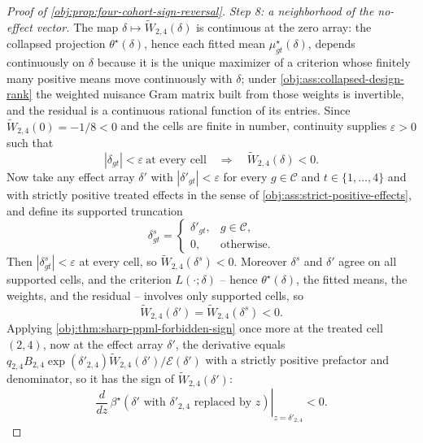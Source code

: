 \begin{proof}[Proof of \cref{obj:prop:four-cohort-sign-reversal}]
\textit{Step 8: a neighborhood of the no-effect vector.} The map \(\delta\mapsto\widetilde W_{2,4}(\delta)\) is continuous at the zero array: the collapsed projection \(\theta^\star(\delta)\), hence each fitted mean \(\mu^\star_{gt}(\delta)\), depends continuously on \(\delta\) because it is the unique maximizer of a criterion whose finitely many positive means move continuously with \(\delta\); under \cref{obj:ass:collapsed-design-rank} the weighted nuisance Gram matrix built from those weights is invertible, and the residual is a continuous rational function of its entries.
Since \(\widetilde W_{2,4}(0)=-1/8<0\) and the cells are finite in number, continuity supplies \(\varepsilon>0\) such that
\[
|\delta_{gt}|<\varepsilon\ \text{at every cell}
\quad\Longrightarrow\quad
\widetilde W_{2,4}(\delta)<0 .
\]
Now take any effect array \(\delta'\) with \(|\delta'_{gt}|<\varepsilon\) for every \(g\in\mathcal C\) and \(t\in\{1,\ldots,4\}\) and with strictly positive treated effects in the sense of \cref{obj:ass:strict-positive-effects}, and define its supported truncation
\[
\delta^s_{gt}=
\begin{cases}
\delta'_{gt}, & g\in\mathcal C,\\
0, & \text{otherwise} .
\end{cases}
\]
Then \(|\delta^s_{gt}|<\varepsilon\) at every cell, so \(\widetilde W_{2,4}(\delta^s)<0\). Moreover \(\delta^s\) and \(\delta'\) agree on all supported cells, and the criterion \(L(\cdot;\delta)\) -- hence \(\theta^\star(\delta)\), the fitted means, the weights, and the residual -- involves only supported cells, so
\[
\widetilde W_{2,4}(\delta')=\widetilde W_{2,4}(\delta^s)<0 .
\]
Applying \cref{obj:thm:sharp-ppml-forbidden-sign} once more at the treated cell \((2,4)\), now at the effect array \(\delta'\), the derivative equals \(q_{2,4}B_{2,4}\exp(\delta'_{2,4})\widetilde W_{2,4}(\delta')/\mathcal E(\delta')\) with a strictly positive prefactor and denominator, so it has the sign of \(\widetilde W_{2,4}(\delta')\):
\[
\left.
\frac{d}{dz}\,
\beta^\star\!\left(\delta'\text{ with }\delta'_{2,4}\text{ replaced by }z\right)
\right|_{z=\delta'_{2,4}}
<0 .
\]
\end{proof}

